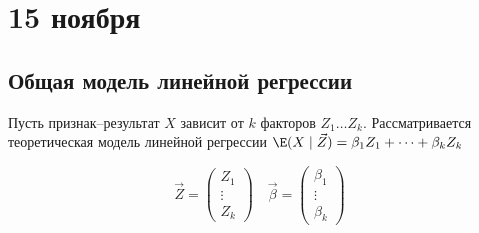 \chapter{15 ноября}

\section{Общая модель линейной регрессии}

Пусть признак--результат \(X\) зависит от \(k\) факторов \(Z_1 \dots Z_k\). Рассматривается теоретическая модель линейной регрессии \(\E(X \mid \vec{Z}) = \beta_1Z_1 + \dots + \beta_kZ_k\)

\begin{notation}
    \[\vec{Z} = \begin{pmatrix}
            Z_1    \\
            \vdots \\
            Z_k
        \end{pmatrix} \quad \vec{\beta} = \begin{pmatrix}
            \beta_1 \\
            \vdots  \\
            \beta_k
        \end{pmatrix}\]
\end{notation}

